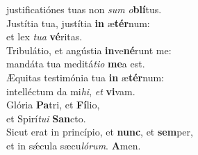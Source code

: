 \oddverse justificatiónes tuas non \textit{sum} \textit{o}\textbf{blí}tus.\\
\evenverse Justítia tua, justítia \textbf{in} æ\textbf{tér}num:~\*\\
\evenverse et lex \textit{tu}\textit{a} \textbf{vé}ritas.\\
\oddverse Tribulátio, et angústia \textbf{in}ve\textbf{né}runt me:~\*\\
\oddverse mandáta tua meditá\textit{ti}\textit{o} \textbf{me}a est.\\
\evenverse Æquitas testimónia tua \textbf{in} æ\textbf{tér}num:~\*\\
\evenverse intelléctum da mi\textit{hi}, \textit{et} \textbf{vi}vam.\\
\oddverse Glória \textbf{Pa}tri, et \textbf{Fí}lio,~\*\\
\oddverse et Spirí\textit{tu}\textit{i} \textbf{San}cto.\\
\evenverse Sicut erat in princípio, et \textbf{nunc}, et \textbf{sem}per,~\*\\
\evenverse et in sǽcula sæcu\textit{ló}\textit{rum}. \textbf{A}men.\\
